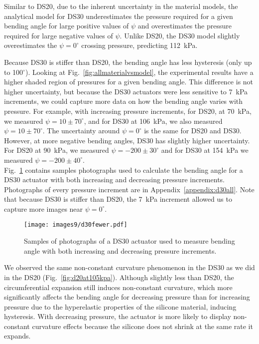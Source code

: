 Similar to DS20, due to the inherent uncertainty in the material models, the analytical model for DS30 underestimates the pressure required for a given bending angle for large positive values of $\psi$ and overestimates the pressure required for large negative values of $\psi$. Unlike DS20, the DS30 model slightly overestimates the $\psi=0^\circ$ crossing pressure, predicting 112~kPa. 

Because DS30 is stiffer than DS20, the bending angle has less hysteresis (only up to 100$^\circ$). Looking at Fig.~\ref{fig:allmaterialvsmodel}, the experimental results have a higher shaded region of pressures for a given bending angle. This difference is not higher uncertainty, but because the DS30 actuators were less sensitive to 7~kPa increments, we could capture more data on how the bending angle varies with pressure. For example, with increasing pressure increments, for DS20, at 70~kPa, we measured $\psi=10\pm70^\circ$, and for DS30 at 106~kPa, we also measured $\psi=10\pm70^\circ$. The uncertainty around $\psi=0^\circ$ is the same for DS20 and DS30. However, at more negative bending angles, DS30 has slightly higher uncertainty. For DS20 at 90~kPa, we measured $\psi=-200\pm30^\circ$ and for DS30 at 154~kPa we measured $\psi=-200\pm40^\circ$. \\

\clearpage
Fig.~\ref{fig:d30fewer} contains samples photographs used to calculate the bending angle for a DS30 actuator with both increasing and decreasing pressure increments. Photographs of every pressure increment are in Appendix~\ref{appendix:d30all}. Note that because DS30 is stiffer than DS20, the 7~kPa increment allowed us to capture more images near $\psi=0^\circ$. 

\begin{figure}[!ht]
    \centering
     \texttt{[image: images9/d30fewer.pdf]}
    \caption{Samples of photographs of a DS30 actuator used to measure bending angle with both increasing and decreasing pressure increments.}
    \label{fig:d30fewer}
\end{figure}

We observed the same non-constant curvature phenomenon in the DS30 as we did in the DS20 (Fig.~\ref{fig:d20at105kpa}). Although slightly less than DS20, the circumferential expansion still induces non-constant curvature, which more significantly affects the bending angle for decreasing pressure than for increasing pressure due to the hyperelastic properties of the silicone material, inducing hysteresis. With decreasing pressure, the actuator is more likely to display non-constant curvature effects because the silicone does not shrink at the same rate it expands. 

